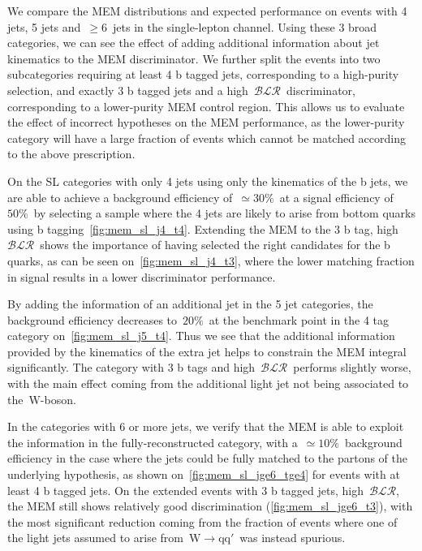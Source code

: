 We compare the MEM distributions and expected performance on events with 4 jets, 5 jets and~$\ge6$~jets in the single-lepton channel. Using these 3 broad categories, we can see the effect of adding additional information about jet kinematics to the MEM discriminator. We further split the events into two subcategories requiring at least 4 b tagged jets, corresponding to a high-purity selection, and exactly 3 b tagged jets and a high~$\mathcal{BLR}$~discriminator, corresponding to a lower-purity MEM control region. This allows us to evaluate the effect of incorrect hypotheses on the MEM performance, as the lower-purity category will have a large fraction of events which cannot be matched according to the above prescription. 

On the SL categories with only 4 jets using only the kinematics of the b jets, we are able to achieve a background efficiency of~$\simeq 30\%$~at a signal efficiency of~$50\%$~by selecting a sample where the 4 jets are likely to arise from bottom quarks using b tagging~\cref{fig:mem_sl_j4_t4}. Extending the MEM to the 3 b tag, high~$\mathcal{BLR}$~shows the importance of having selected the right candidates for the b quarks, as can be seen on~\cref{fig:mem_sl_j4_t3}, where the lower matching fraction in signal results in a lower discriminator performance.

By adding the information of an additional jet in the 5 jet categories, the background efficiency decreases to~$20\%$~at the benchmark point in the 4 tag category on~\cref{fig:mem_sl_j5_t4}. Thus we see that the additional information provided by the kinematics of the extra jet helps to constrain the MEM integral significantly. The category with 3 b tags and high~$\mathcal{BLR}$~performs slightly worse, with the main effect coming from the additional light jet not being associated to the~$\mathrm{W}$-boson.

In the categories with 6 or more jets, we verify that the MEM is able to exploit the information in the fully-reconstructed category, with a~$\simeq 10\%$~background efficiency in the case where the jets could be fully matched to the partons of the underlying hypothesis, as shown on~\cref{fig:mem_sl_jge6_tge4} for events with at least 4 b tagged jets. On the extended events with 3 b tagged jets, high~$\mathcal{BLR}$, the MEM still shows relatively good discrimination (\cref{fig:mem_sl_jge6_t3}), with the most significant reduction coming from the fraction of events where one of the light jets assumed to arise from~$\mathrm{W} \rightarrow \mathrm{q} \mathrm{q}'$~was instead spurious.

